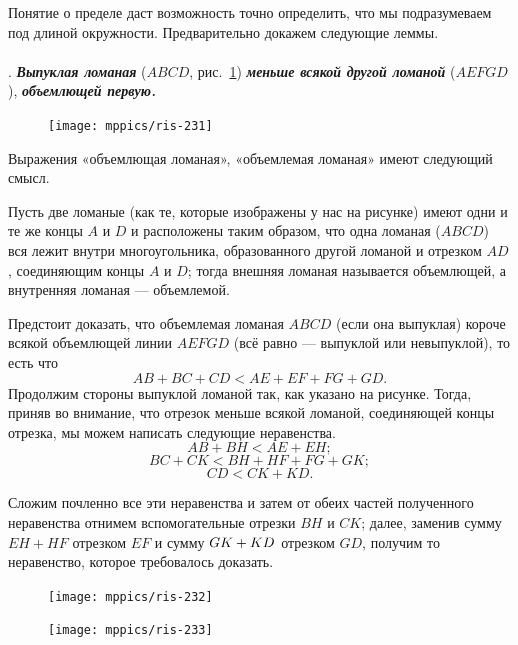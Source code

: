 \documentclass[oneside]{book}
\begin{document}
Понятие о пределе даст возможность точно определить, что мы подразумеваем под длиной окружности.
Предварительно докажем следующие леммы.

\paragraph{}\label{1938/232}
.
\textbf{\emph{Выпуклая ломаная}} ($ABCD$, рис.~\ref{1938/ris-231}) \textbf{\emph{меньше всякой другой ломаной}} ($AEFGD$), \textbf{\emph{объемлющей первую.}}

\begin{figure}
\centering
\texttt{[image: mppics/ris-231]}
\caption{}\label{1938/ris-231}
\end{figure}


Выражения «объемлющая ломаная», «объемлемая ломаная» имеют следующий смысл.

Пусть две ломаные (как те, которые изображены у нас на рисунке) имеют одни и те же концы $A$ и $D$ и расположены таким образом, что одна ломаная ($ABCD$) вся лежит внутри многоугольника, образованного другой ломаной и отрезком $AD$, соединяющим концы $A$ и $D$;
тогда внешняя ломаная называется объемлющей, а внутренняя ломаная — объемлемой.

Предстоит доказать, что объемлемая ломаная $ABCD$ (если она выпуклая) короче всякой объемлющей линии $AEFGD$ (всё равно — выпуклой или невыпуклой), то есть
что
\[AB+BC+CD<AE+EF+FG+GD.\]
Продолжим стороны выпуклой ломаной так, как указано на рисунке.
Тогда, приняв во внимание, что отрезок меньше всякой ломаной, соединяющей концы отрезка, мы можем написать следующие неравенства.
\[AB+BH<AE+EH;\]
\[BC+CK<BH+HF+FG+GK;\]
\[CD<CK+KD.\]

Сложим почленно все эти неравенства и затем от обеих частей полученного неравенства отнимем вспомогательные отрезки $BH$ и $CK$;
далее, заменив сумму $EH+HF$ отрезком $EF$ и сумму $GK\z+KD$ отрезком $GD$, получим то неравенство, которое требовалось доказать.

\begin{figure}[h!]
\begin{minipage}{.48\textwidth}
\centering
\texttt{[image: mppics/ris-232]}
\caption{}\label{1938/ris-232}
\end{minipage}\hfill
\begin{minipage}{.48\textwidth}
\centering
\texttt{[image: mppics/ris-233]}
\caption{}\label{1938/ris-233}
\end{minipage}
\end{figure}
\end{document}
